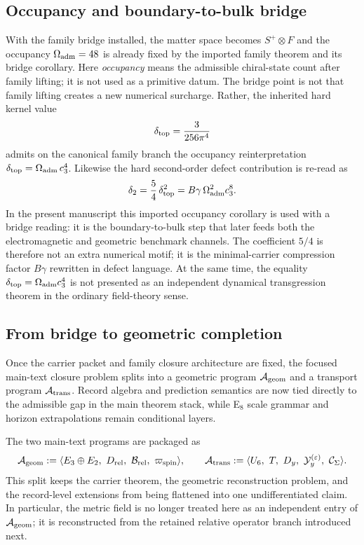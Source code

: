 \subsection{Occupancy and boundary-to-bulk bridge}

With the family bridge installed, the matter space becomes $S^+\otimes F$ and the occupancy $\Omega_{\mathrm{adm}}=48$ is already fixed by the imported family theorem and its bridge corollary. Here \emph{occupancy} means the admissible chiral-state count after family lifting; it is not used as a primitive datum. The bridge point is not that family lifting creates a new numerical surcharge. Rather, the inherited hard kernel value
\[
\delta_{\mathrm{top}}=\frac{3}{256\pi^4}
\]
admits on the canonical family branch the occupancy reinterpretation $\delta_{\mathrm{top}}=\Omega_{\mathrm{adm}}\,c_3^4$.
Likewise the hard second-order defect contribution is re-read as
\[
\delta_2=\frac54\,\delta_{\mathrm{top}}^2=B\gamma\,\Omega_{\mathrm{adm}}^2c_3^8.
\]
In the present manuscript this imported occupancy corollary is used with a bridge reading: it is the boundary-to-bulk step that later feeds both the electromagnetic and geometric benchmark channels. The coefficient $5/4$ is therefore not an extra numerical motif; it is the minimal-carrier compression factor $B\gamma$ rewritten in defect language. At the same time, the equality $\delta_{\mathrm{top}}=\Omega_{\mathrm{adm}}c_3^4$ is not presented as an independent dynamical transgression theorem in the ordinary field-theory sense.

\subsection{From bridge to geometric completion}

\begin{principle}
Once the carrier packet and family closure architecture are fixed, the focused main-text closure problem splits into a geometric program $\mathcal A_{\mathrm{geom}}$ and a transport program $\mathcal A_{\mathrm{trans}}$. Record algebra and prediction semantics are now tied directly to the admissible gap in the main theorem stack, while E$_8$ scale grammar and horizon extrapolations remain conditional layers.
\end{principle}

The two main-text programs are packaged as
\[
\Ageom
:=
\langle E_3\oplus E_2,\ D_{\mathrm{rel}},\ \mathcal B_{\mathrm{rel}},\ \wspin\rangle,
\qquad
\Atrans
:=
\langle U_6,\ T,\ D_y,\ \mathcal Y_y^{(\varepsilon)},\ \mathcal C_{\Seam}\rangle.
\]
This split keeps the carrier theorem, the geometric reconstruction problem, and the record-level extensions from being flattened into one undifferentiated claim. In particular, the metric field is no longer treated here as an independent entry of $\mathcal A_{\mathrm{geom}}$; it is reconstructed from the retained relative operator branch introduced next.

